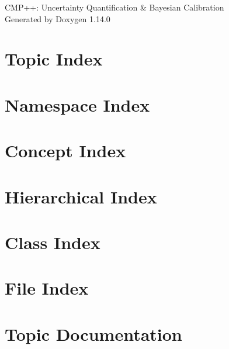 \documentclass[twoside]{book}
\newcommand{\+}{\discretionary{\mbox{\scriptsize$\hookleftarrow$}}{}{}}
\newcommand{\clearemptydoublepage}{%
    \newpage{\pagestyle{empty}\cleardoublepage}%
  }
\begin{document}
  \raggedbottom
    \hypersetup{pageanchor=false,
                bookmarksnumbered=true,
                pdfencoding=unicode
               }
  \begin{titlepage}
  \vspace*{7cm}
  \begin{center}%
  {\Large CMP++\+: Uncertainty Quantification \& Bayesian Calibration}\\
  \vspace*{1cm}
  {\large Generated by Doxygen 1.14.0}\\
  \end{center}
  \end{titlepage}
  \clearemptydoublepage
  \tableofcontents
  \clearemptydoublepage
  \hypersetup{pageanchor=true}

\chapter{Topic Index}

\chapter{Namespace Index}

\chapter{Concept Index}

\chapter{Hierarchical Index}

\chapter{Class Index}

\chapter{File Index}

\chapter{Topic Documentation}







\end{document}
